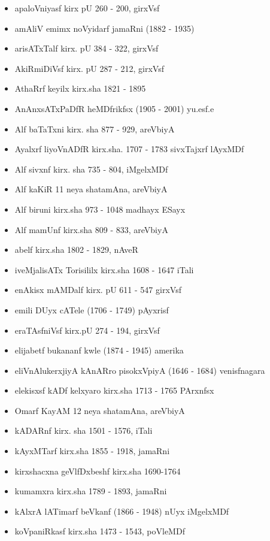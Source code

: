 {\renewcommand\labelitemi{}
\begin{itemize}
\item apaloVniyasf kirx pU {\rm 260 - 200}, girxVsf
\item amAliV emimx noVyidarf jamaRni {\rm (1882 - 1935)}
\item arisATxTalf kirx. pU {\rm 384 - 322}, girxVsf
\item AkiRmiDiVsf kirx. pU {\rm 287 - 212}, girxVsf
\item AthaRrf keyilx kirx.sha {\rm 1821 - 1895}
\item AnAnxsATxPaDfR heMDfrikfsx {\rm (1905 - 2001)} yu.esf.e
\item Alf baTaTxni kirx. sha {\rm 877 - 929}, areVbiyA
\item Ayalxrf liyoVnADfR kirx.sha. {\rm 1707 - 1783} sivxTajxrf lAyxMDf
\item Alf sivxnf kirx. sha {\rm 735 - 804}, iMgelxMDf
\item Alf kaKiR {\rm 11} neya shatamAna, areVbiyA
\item Alf biruni kirx.sha {\rm 973 - 1048} madhayx ESayx
\item Alf mamUnf kirx.sha {\rm 809 - 833}, areVbiyA
\item abelf kirx.sha {\rm 1802 - 1829}, nAveR
\item iveMjalisATx Torisililx kirx.sha {\rm 1608 - 1647} iTali
\item enAkisx mAMDalf kirx. pU {\rm 611 - 547} girxVsf
\item emili DUyx cATele {\rm (1706 - 1749)} pAyxrisf
\item eraTAsfniVsf kirx.pU {\rm 274 - 194}, girxVsf
\item elijabetf bukananf kwle {\rm (1874 - 1945)} amerika
\item eliVnAlukerxjiyA kAnARro pisokxVpiyA {\rm (1646 - 1684)} venisfnagara
\item elekisxsf kADf kelxyaro kirx.sha {\rm 1713 - 1765} PArxnfsx
\item Omarf KayAM {\rm 12} neya shatamAna, areVbiyA
\item kADARnf kirx. sha {\rm 1501 - 1576}, iTali
\item kAyxMTarf kirx.sha {\rm 1855 - 1918}, jamaRni
\item kirxshacxna geVlfDxbeshf kirx.sha {\rm 1690-1764}
\item kumamxra kirx.sha {\rm 1789 - 1893}, jamaRni
\item kAlxrA lATimarf beVkanf {\rm (1866 - 1948)} nUyx iMgelxMDf
\item koVpaniRkasf kirx.sha {\rm 1473 - 1543}, poVleMDf

\end{itemize}}
